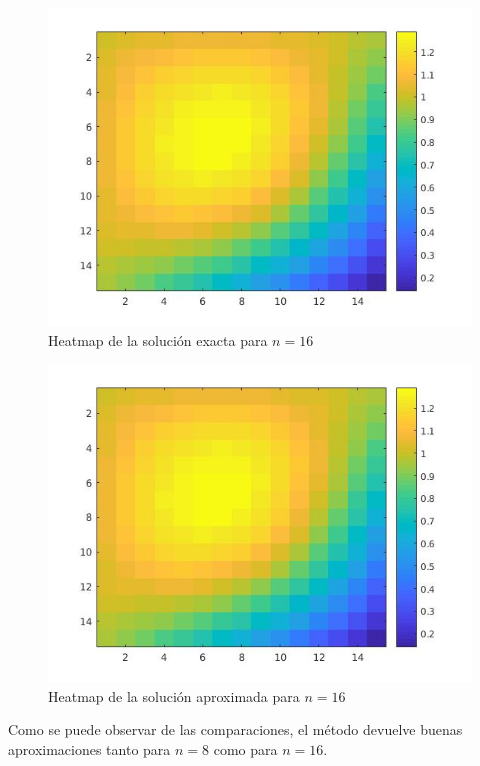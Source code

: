 \begin{itemize}
%
\begin{figure}[H]
	\centering
	\includegraphics[scale=0.35]{images/img_prob_6_colormap_n16_exact.jpg}
	\caption{Heatmap de la solución exacta para $n=16$}
	\label{fig:img_pecc}
\end{figure}
%
\begin{figure}[H]
	\centering
	\includegraphics[scale=0.35]{images/img_prob_6_colormap_n16_approx.jpg}
	\caption{Heatmap de la solución aproximada para $n=16$}
	\label{fig:img_pecc}
\end{figure}
Como se puede observar de las comparaciones, el método devuelve buenas aproximaciones tanto para $n=8$ como para $n=16$.


\end{itemize}
